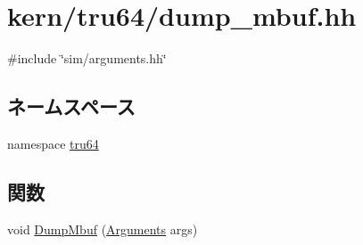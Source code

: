 \hypertarget{dump__mbuf_8hh}{
\section{kern/tru64/dump\_\-mbuf.hh}
\label{dump__mbuf_8hh}
}
{\ttfamily \#include \char`\"{}sim/arguments.hh\char`\"{}}\par
\subsection*{ネームスペース}
\begin{DoxyCompactItemize}
\item 
namespace \hyperlink{namespacetru64}{tru64}
\end{DoxyCompactItemize}
\subsection*{関数}
\begin{DoxyCompactItemize}
\item 
void \hyperlink{namespacetru64_ac9ff980e04e67585b5b3669ab36ad109}{DumpMbuf} (\hyperlink{classArguments}{Arguments} args)
\end{DoxyCompactItemize}
